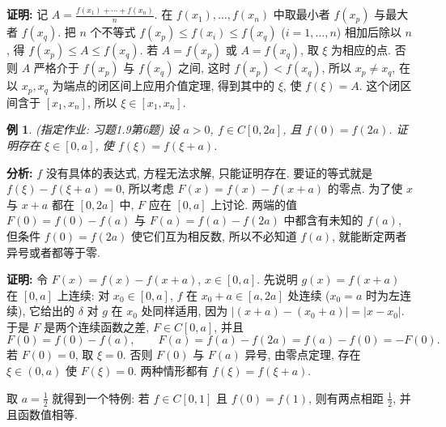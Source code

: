\documentclass[UTF8,openany]{ctexbook}
\theoremstyle{chinesetextbook}
\newtheorem{example}{例}[section]
\newenvironment{cnproof}{\par\indent\textbf{证明:} \ignorespaces}{\par}
\begin{document}
\begin{cnproof}
记 $\displaystyle A=\frac{f(x_1)+\cdots+f(x_n)}n$. 在 $f(x_1),\ldots,f(x_n)$ 中取最小者 $f(x_p)$ 与最大者 $f(x_q)$. 把 $n$ 个不等式 $f(x_p)\le f(x_i)\le f(x_q)$ ($i=1,\ldots,n$) 相加后除以 $n$, 得 $f(x_p)\le A\le f(x_q)$. 若 $A=f(x_p)$ 或 $A=f(x_q)$, 取 $\xi$ 为相应的点. 否则 $A$ 严格介于 $f(x_p)$ 与 $f(x_q)$ 之间, 这时 $f(x_p)<f(x_q)$, 所以 $x_p\ne x_q$, 在以 $x_p,x_q$ 为端点的闭区间上应用介值定理, 得到其中的 $\xi$, 使 $f(\xi)=A$. 这个闭区间含于 $[x_1,x_n]$, 所以 $\xi\in[x_1,x_n]$.
\end{cnproof}
\begin{example}
\textnormal{(指定作业: 习题1.9第6题)} 设 $a>0$, $f\in C[0,2a]$, 且 $f(0)=f(2a)$. 证明存在 $\xi\in[0,a]$, 使 $f(\xi)=f(\xi+a)$.
\end{example}
\par\indent\textbf{分析:} $f$ 没有具体的表达式, 方程无法求解, 只能证明存在. 要证的等式就是 $f(\xi)-f(\xi+a)=0$, 所以考虑 $F(x)=f(x)-f(x+a)$ 的零点. 为了使 $x$ 与 $x+a$ 都在 $[0,2a]$ 中, $F$ 应在 $[0,a]$ 上讨论. 两端的值 $F(0)=f(0)-f(a)$ 与 $F(a)=f(a)-f(2a)$ 中都含有未知的 $f(a)$, 但条件 $f(0)=f(2a)$ 使它们互为相反数, 所以不必知道 $f(a)$, 就能断定两者异号或者都等于零.
\begin{cnproof}
令 $F(x)=f(x)-f(x+a)$, $x\in[0,a]$. 先说明 $g(x)=f(x+a)$ 在 $[0,a]$ 上连续: 对 $x_0\in[0,a]$, $f$ 在 $x_0+a\in[a,2a]$ 处连续 ($x_0=a$ 时为左连续), 它给出的 $\delta$ 对 $g$ 在 $x_0$ 处同样适用, 因为 $|(x+a)-(x_0+a)|=|x-x_0|$. 于是 $F$ 是两个连续函数之差, $F\in C[0,a]$, 并且
\[
F(0)=f(0)-f(a),\qquad F(a)=f(a)-f(2a)=f(a)-f(0)=-F(0).
\]
若 $F(0)=0$, 取 $\xi=0$. 否则 $F(0)$ 与 $F(a)$ 异号, 由零点定理, 存在 $\xi\in(0,a)$ 使 $F(\xi)=0$. 两种情形都有 $f(\xi)=f(\xi+a)$.
\end{cnproof}
取 $\displaystyle a=\frac12$ 就得到一个特例: 若 $f\in C[0,1]$ 且 $f(0)=f(1)$, 则有两点相距 $\displaystyle\frac12$, 并且函数值相等.
\end{document}
